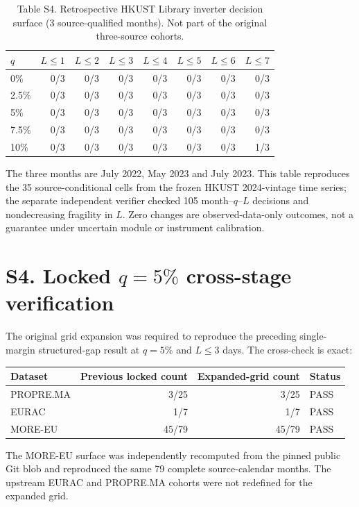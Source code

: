 \documentclass[11pt]{article}
\begin{document}
\begin{table}[h]
\centering
\caption*{Table S4. Retrospective HKUST Library inverter decision surface (3 source-qualified months). Not part of the original three-source cohorts.}
\small
\begin{tabular}{lrrrrrrr}
\toprule
$q$ & $L\le1$ & $L\le2$ & $L\le3$ & $L\le4$ & $L\le5$ & $L\le6$ & $L\le7$ \\
\midrule
0\% & 0/3 & 0/3 & 0/3 & 0/3 & 0/3 & 0/3 & 0/3 \\
2.5\% & 0/3 & 0/3 & 0/3 & 0/3 & 0/3 & 0/3 & 0/3 \\
5\% & 0/3 & 0/3 & 0/3 & 0/3 & 0/3 & 0/3 & 0/3 \\
7.5\% & 0/3 & 0/3 & 0/3 & 0/3 & 0/3 & 0/3 & 0/3 \\
10\% & 0/3 & 0/3 & 0/3 & 0/3 & 0/3 & 0/3 & 1/3 \\
\bottomrule
\end{tabular}
\end{table}

The three months are July 2022, May 2023 and July 2023. This table reproduces the 35 source-conditional cells from the frozen HKUST 2024-vintage time series; the separate independent verifier checked 105 month--$q$--$L$ decisions and nondecreasing fragility in $L$. Zero changes are observed-data-only outcomes, not a guarantee under uncertain module or instrument calibration.

\section*{S4. Locked $q=5\%$ cross-stage verification}
The original grid expansion was required to reproduce the preceding single-margin structured-gap result at $q=5\%$ and $L\le3$ days. The cross-check is exact:

\begin{center}
\begin{tabular}{lrrl}
\toprule
Dataset & Previous locked count & Expanded-grid count & Status \\
\midrule
PROPRE.MA & 3/25 & 3/25 & PASS \\
EURAC & 1/7 & 1/7 & PASS \\
MORE-EU & 45/79 & 45/79 & PASS \\
\bottomrule
\end{tabular}
\end{center}

The MORE-EU surface was independently recomputed from the pinned public Git blob and reproduced the same 79 complete source-calendar months. The upstream EURAC and PROPRE.MA cohorts were not redefined for the expanded grid.
\end{document}
